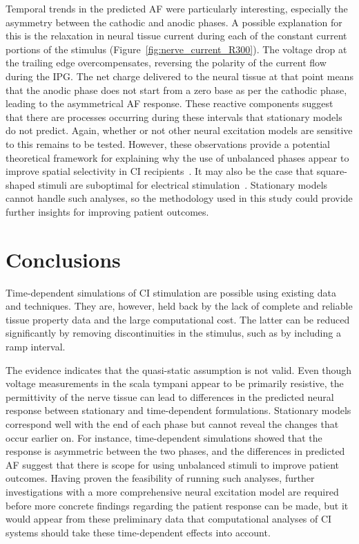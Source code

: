 Temporal trends in the predicted AF were particularly interesting, especially
the asymmetry between the cathodic and anodic phases. A possible explanation for
this is the relaxation in neural tissue current during each of the constant
current portions of the stimulus (Figure~\ref{fig:nerve_current_R300}). The
voltage drop at the trailing edge overcompensates, reversing the polarity of the
current flow during the IPG. The net charge delivered to the neural tissue at
that point means that the anodic phase does not start from a zero base as per
the cathodic phase, leading to the asymmetrical AF response. These reactive
components suggest that there are processes occurring during these intervals
that stationary models do not predict. Again, whether or not other neural
excitation models are sensitive to this remains to be tested. However, these
observations provide a potential theoretical framework for explaining why the
use of unbalanced phases appear to improve spatial selectivity in CI
recipients~\cite{carlyon2015ciap}. It may also be the case that square-shaped
stimuli are suboptimal for electrical
stimulation~\cite{tahayori2013challenging,tahayori2013optimal}. Stationary
models cannot handle such analyses, so the methodology used in this study could
provide further insights for improving patient outcomes.

\section{Conclusions}

Time-dependent simulations of CI stimulation are possible using existing data
and techniques. They are, however, held back by the lack of complete and
reliable tissue property data and the large computational cost. The latter can
be reduced significantly by removing discontinuities in the stimulus, such as by
including a ramp interval.

The evidence indicates that the quasi-static assumption is not valid. Even
though voltage measurements in the scala tympani appear to be primarily
resistive, the permittivity of the nerve tissue can lead to differences in the
predicted neural response between stationary and time-dependent formulations.
Stationary models correspond well with the end of each phase but cannot reveal
the changes that occur earlier on. For instance, time-dependent simulations
showed that the response is asymmetric between the two phases, and the
differences in predicted AF suggest that there is scope for using unbalanced
stimuli to improve patient outcomes. Having proven the feasibility of running
such analyses, further investigations with a more comprehensive neural
excitation model are required before more concrete findings regarding the
patient response can be made, but it would appear from these preliminary data
that computational analyses of CI systems should take these time-dependent
effects into account.
